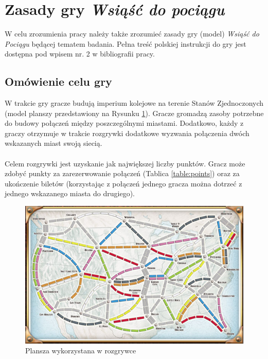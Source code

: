 \documentclass[12pt, oneside]{report}
\begin{document}
	\section{Zasady gry \textit{Wsiąść do pociągu}}
	W celu zrozumienia pracy należy także zrozumieć zasady gry (model) \textit{Wsiąść do Pociągu} będącej tematem badania. Pełna treść polskiej instrukcji do gry jest dostępna pod wpisem nr. 2 w bibliografii pracy.
	\subsection{Omówienie celu gry}
	W trakcie gry gracze budują imperium kolejowe na terenie Stanów Zjednoczonych (model planszy przedstawiony na Rysunku \ref{figure:world map}). Gracze gromadzą zasoby potrzebne do budowy połączeń między poszczególnymi miastami. Dodatkowo, każdy z graczy otrzymuje w trakcie rozgrywki dodatkowe wyzwania połączenia dwóch wskazanych miast swoją siecią. \\ \\
	Celem rozgrywki jest uzyskanie jak największej liczby punktów. Gracz może zdobyć punkty za zarezerwowanie połączeń (Tablica  \ref{table:points}) oraz za ukończenie biletów (korzystając z połączeń jednego gracza można dotrzeć z jednego wskazanego miasta do drugiego).
	
	\begin{figure}[h]
		\includegraphics[width=\linewidth]{ticket-to-ride-board-map.jpg}
		\caption{Plansza wykorzystana w rozgrywce}
		\label{figure:world map}
	\end{figure}
	
\end{document}
